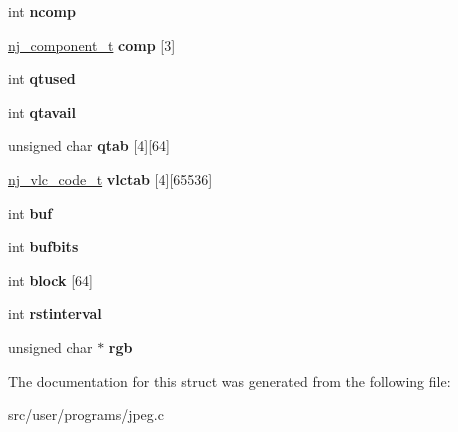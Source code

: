 \begin{DoxyCompactItemize}
\mbox{\label{struct__nj__ctx_ae652255f8813d684d442873489c6bd56}} 
int {\bfseries ncomp}
\item 
\mbox{\label{struct__nj__ctx_a76d6d3e14b068caf66543371ba6a7f1d}} 
\hyperlink{struct__nj__cmp}{nj\+\_\+component\+\_\+t} {\bfseries comp} \mbox{[}3\mbox{]}
\item 
\mbox{\label{struct__nj__ctx_a1ba9f028b4e9b86fb168dd30418363bb}} 
int {\bfseries qtused}
\item 
\mbox{\label{struct__nj__ctx_a2329c969f2b5bea5e4c34f9fc9d9b2bd}} 
int {\bfseries qtavail}
\item 
\mbox{\label{struct__nj__ctx_a2b3e4b6518322bd86dfcfe2b01cdc728}} 
unsigned char {\bfseries qtab} \mbox{[}4\mbox{]}\mbox{[}64\mbox{]}
\item 
\mbox{\label{struct__nj__ctx_a517df4da9db060661a0d1b28e3f78103}} 
\hyperlink{struct__nj__code}{nj\+\_\+vlc\+\_\+code\+\_\+t} {\bfseries vlctab} \mbox{[}4\mbox{]}\mbox{[}65536\mbox{]}
\item 
\mbox{\label{struct__nj__ctx_a9c2bbf8c9eb13f731f499b7bd772c11f}} 
int {\bfseries buf}
\item 
\mbox{\label{struct__nj__ctx_a7c7fdf75d8225d2c391987659ff61e9e}} 
int {\bfseries bufbits}
\item 
\mbox{\label{struct__nj__ctx_abc90a4d1499e1c79f13fa00a92cb12c6}} 
int {\bfseries block} \mbox{[}64\mbox{]}
\item 
\mbox{\label{struct__nj__ctx_ab41c08a3c6810d8cde6f297fda8078f7}} 
int {\bfseries rstinterval}
\item 
\mbox{\label{struct__nj__ctx_ae67f24ee5f50fe0252fe56d5d7117b27}} 
unsigned char $\ast$ {\bfseries rgb}
\end{DoxyCompactItemize}


The documentation for this struct was generated from the following file\+:\begin{DoxyCompactItemize}
\item 
src/user/programs/jpeg.\+c\end{DoxyCompactItemize}
